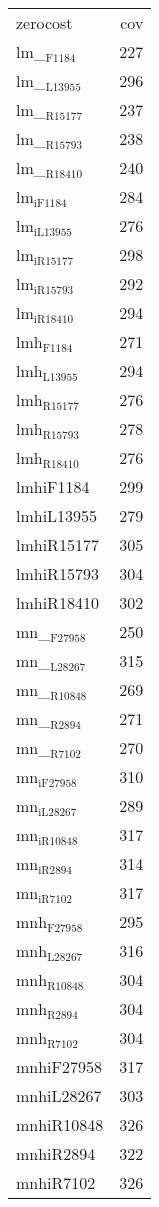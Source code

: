 \begin{center}
\begin{tabular}{lr}
zerocost & cov\\
lm\_$_{\text{F1184}}$ & 227\\
lm\_$_{\text{L13955}}$ & 296\\
lm\_$_{\text{R15177}}$ & 237\\
lm\_$_{\text{R15793}}$ & 238\\
lm\_$_{\text{R18410}}$ & 240\\
lm$_{\text{iF1184}}$ & 284\\
lm$_{\text{iL13955}}$ & 276\\
lm$_{\text{iR15177}}$ & 298\\
lm$_{\text{iR15793}}$ & 292\\
lm$_{\text{iR18410}}$ & 294\\
lmh$_{\text{F1184}}$ & 271\\
lmh$_{\text{L13955}}$ & 294\\
lmh$_{\text{R15177}}$ & 276\\
lmh$_{\text{R15793}}$ & 278\\
lmh$_{\text{R18410}}$ & 276\\
lmhiF1184 & 299\\
lmhiL13955 & 279\\
lmhiR15177 & 305\\
lmhiR15793 & 304\\
lmhiR18410 & 302\\
mn\_$_{\text{F27958}}$ & 250\\
mn\_$_{\text{L28267}}$ & 315\\
mn\_$_{\text{R10848}}$ & 269\\
mn\_$_{\text{R2894}}$ & 271\\
mn\_$_{\text{R7102}}$ & 270\\
mn$_{\text{iF27958}}$ & 310\\
mn$_{\text{iL28267}}$ & 289\\
mn$_{\text{iR10848}}$ & 317\\
mn$_{\text{iR2894}}$ & 314\\
mn$_{\text{iR7102}}$ & 317\\
mnh$_{\text{F27958}}$ & 295\\
mnh$_{\text{L28267}}$ & 316\\
mnh$_{\text{R10848}}$ & 304\\
mnh$_{\text{R2894}}$ & 304\\
mnh$_{\text{R7102}}$ & 304\\
mnhiF27958 & 317\\
mnhiL28267 & 303\\
mnhiR10848 & 326\\
mnhiR2894 & 322\\
mnhiR7102 & 326\\
\end{tabular}
\end{center}
